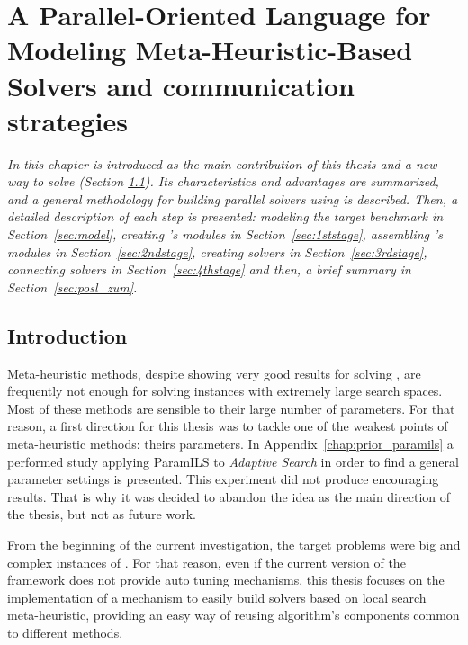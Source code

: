 \chapter[\posl{}: Parallel Oriented Solver~Language]{A Parallel-Oriented Language for Modeling Meta-Heuristic-Based Solvers and communication strategies}
\label{chap:posl}
\textit{In this chapter \posl{} is introduced as the main contribution of this thesis and a new way to solve \csps{} (Section \ref{sec:posl_intro}). Its characteristics and advantages are summarized, and a general methodology for building parallel solvers using \posl{} is described. Then, a detailed description of each step is presented: modeling the target benchmark in Section~\ref{sec:model}, creating \posl's modules in Section~\ref{sec:1ststage}, assembling \posl's modules in Section~\ref{sec:2ndstage}, creating \posl{} solvers in Section~\ref{sec:3rdstage}, connecting solvers in Section~\ref{sec:4thstage} and then, a brief summary in Section~\ref{sec:posl_zum}.}
\vfill
\minitoc
\newpage

\section{Introduction}
\label{sec:posl_intro}

Meta-heuristic methods, despite showing very good results for solving \CSPs, are frequently not enough for solving instances with extremely large search spaces. Most of these methods are sensible to their large number of parameters. For that reason, a first direction for this thesis was to tackle one of the weakest points of meta-heuristic methods: theirs parameters. In Appendix~\ref{chap:prior_paramils} a performed study applying {\sc ParamILS} to {\it Adaptive Search} in order to find a general parameter settings is presented. This experiment did not produce encouraging results. That is why it was decided to abandon the idea as the main direction of the thesis, but not as future work.

From the beginning of the current investigation, the target problems were big and complex instances of \csps. For that reason, even if the current version of the framework does not provide auto tuning mechanisms, this thesis focuses on the implementation of a mechanism to easily build solvers based on local search meta-heuristic, providing an easy way of reusing algorithm's components common to different methods.

